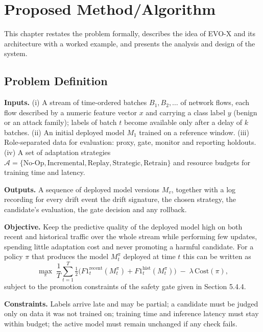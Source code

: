 \documentclass{article}
\begin{document}
\pagebreak
	\section{Proposed Method/Algorithm }

This chapter restates the problem formally, describes the idea of EVO-X and its architecture with a worked example, and presents the analysis and design of the system.

	\subsection{Problem Definition}

\textbf{Inputs.} (i) A stream of time-ordered batches $B_1,B_2,\dots$ of network flows, each flow described by a numeric feature vector $x$ and carrying a class label $y$ (benign or an attack family); labels of batch $t$ become available only after a delay of $k$ batches. (ii) An initial deployed model $M_1$ trained on a reference window. (iii) Role-separated data for evaluation: proxy, gate, monitor and reporting holdouts. (iv) A set of adaptation strategies $\mathcal{A}=\{\text{No-Op},\text{Incremental},\text{Replay},\text{Strategic},\text{Retrain}\}$ and resource budgets for training time and latency.

\textbf{Outputs.} A sequence of deployed model versions $M_v$, together with a log recording for every drift event the drift signature, the chosen strategy, the candidate's evaluation, the gate decision and any rollback.

\textbf{Objective.} Keep the predictive quality of the deployed model high on both recent and historical traffic over the whole stream while performing few updates, spending little adaptation cost and never promoting a harmful candidate. For a policy $\pi$ that produces the model $M^{\pi}_t$ deployed at time $t$ this can be written as
\begin{equation}
\max_{\pi}\; \frac{1}{T}\sum_{t=1}^{T}\tfrac12\big(F1^{\text{recent}}_t(M^{\pi}_t)+F1^{\text{hist}}_t(M^{\pi}_t)\big)\;-\;\lambda\,\text{Cost}(\pi),
\end{equation}
subject to the promotion constraints of the safety gate given in Section 5.4.4.

\textbf{Constraints.} Labels arrive late and may be partial; a candidate must be judged only on data it was not trained on; training time and inference latency must stay within budget; the active model must remain unchanged if any check fails.
\end{document}
